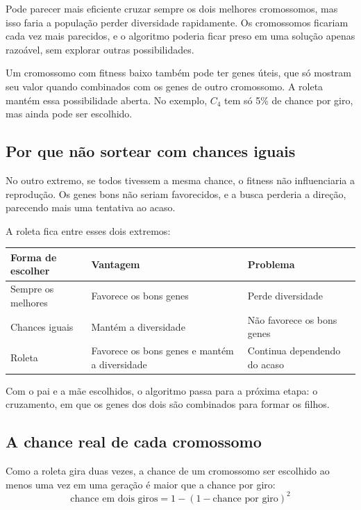 \documentclass[11pt,a4paper]{article}
\newenvironment{tabela}{\par\nopagebreak[4]\vspace{0.3em}\nopagebreak[4]\begingroup\centering\small}{\par\endgroup\vspace{0.6em}}
\begin{document}
Pode parecer mais eficiente cruzar sempre os dois melhores cromossomos, mas isso faria a população perder diversidade rapidamente. Os cromossomos ficariam cada vez mais parecidos, e o algoritmo poderia ficar preso em uma solução apenas razoável, sem explorar outras possibilidades.

Um cromossomo com fitness baixo também pode ter genes úteis, que só mostram seu valor quando combinados com os genes de outro cromossomo. A roleta mantém essa possibilidade aberta. No exemplo, $C_4$ tem só 5\% de chance por giro, mas ainda pode ser escolhido.

\subsection{Por que não sortear com chances iguais}

No outro extremo, se todos tivessem a mesma chance, o fitness não influenciaria a reprodução. Os genes bons não seriam favorecidos, e a busca perderia a direção, parecendo mais uma tentativa ao acaso.

A roleta fica entre esses dois extremos:

\begin{tabela}
\begin{tabularx}{\linewidth}{lLL}
\toprule
Forma de escolher & Vantagem & Problema\\
\midrule
Sempre os melhores & Favorece os bons genes & Perde diversidade\\
Chances iguais & Mantém a diversidade & Não favorece os bons genes\\
Roleta & Favorece os bons genes e mantém a diversidade & Continua dependendo do acaso\\
\bottomrule
\end{tabularx}
\end{tabela}

Com o pai e a mãe escolhidos, o algoritmo passa para a próxima etapa: o cruzamento, em que os genes dos dois são combinados para formar os filhos.

\subsection{A chance real de cada cromossomo}

Como a roleta gira duas vezes, a chance de um cromossomo ser escolhido ao menos uma vez em uma geração é maior que a chance por giro:
\[
  \text{chance em dois giros} = 1 - (1 - \text{chance por giro})^2
\]
\end{document}
